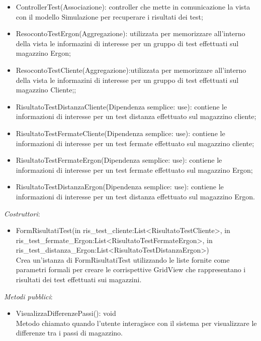 \begin{itemize}
    \item ControllerTest(Associazione): controller che mette in comunicazione la vista con il modello Simulazione per recuperare i risultati dei test;\\
    \item ResocontoTestErgon(Aggregazione): utilizzata per memorizzare all'interno della vista le informazini di interesse per un gruppo di test effettuati sul magazzino Ergon;\\
    \item ResocontoTestCliente(Aggregazione):utilizzata per memorizzare all'interno della vista le informazini di interesse per un gruppo di test effettuati sul magazzino Cliente;;\\
    \item RisultatoTestDistanzaCliente(Dipendenza semplice: use): contiene le informazioni di interesse per un test distanza effettuato sul magazzino cliente;\\
    \item RisultatoTestFermateCliente(Dipendenza semplice: use): contiene le informazioni di interesse per un test fermate effettuato sul magazzino cliente;\\
    \item RisultatoTestFermateErgon(Dipendenza semplice: use): contiene le informazioni di interesse per un test fermate effettuato sul magazzino Ergon;\\
    \item RisultatoTestDistanzaErgon(Dipendenza semplice: use): contiene le informazioni di interesse per un test distanza effettuato sul magazzino Ergon.\\
\end{itemize}
\textit{Costruttori}:\\
\begin{itemize}
    \item FormRisultatiTest(in ris\_test\_cliente:List<RisultatoTestCliente>, in ris\_test\_fermate\_Ergon:List<RisultatoTestFermateErgon>, in ris\_test\_distanza\_Ergon:List<RisultatoTestDistanzaErgon>)\\
    Crea un'istanza di FormRisultatiTest utilizzando le liste fornite come parametri formali per creare le corrispettive GridView che rappresentano 
    i risultati dei test effettuati sui magazzini.
\end{itemize}
\textit{Metodi pubblici}:\\
\begin{itemize}
    \item VisualizzaDifferenzePassi(): void \\
    Metodo chiamato quando l'utente interagisce con il sistema per visualizzare le differenze tra i passi di magazzino.
\end{itemize} 
